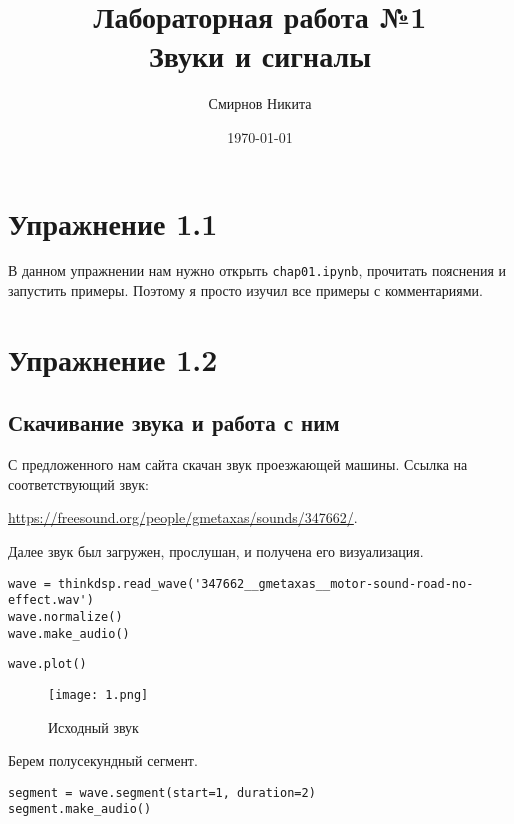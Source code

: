 \documentclass[a4paper,12pt]{report}
\title{Лабораторная работа №1\\Звуки и сигналы}
\author{Смирнов Никита}
\date{\today}
\begin{document}
\maketitle
\tableofcontents
\listoffigures
\lstlistoflistings

\maketitle

\chapter{Упражнение 1.1}

В данном упражнении нам нужно открыть \texttt{chap01.ipynb}, прочитать пояснения и  запустить примеры. Поэтому я просто изучил все примеры с комментариями. 

\chapter{Упражнение 1.2}
\section{Скачивание звука и работа с ним}

С предложенного нам сайта скачан звук проезжающей машины. Ссылка на соответствующий звук:

\href{https://freesound.org/people/gmetaxas/sounds/347662/}{https://freesound.org/people/gmetaxas/sounds/347662/}.

Далее звук был загружен, прослушан, и получена его визуализация.

\begin{lstlisting}[caption=Загрузка и прослушивание звука]
wave = thinkdsp.read_wave('347662__gmetaxas__motor-sound-road-no-effect.wav')
wave.normalize()
wave.make_audio()
\end{lstlisting}

\begin{lstlisting}[caption=Визуализация звука]
wave.plot()
\end{lstlisting}

\begin{figure}[H]
        \centering
        \texttt{[image: 1.png]}
        \caption{Исходный звук}
        \label{fig: fig2_1}
\end{figure}
    
Берем полусекундный сегмент.

\begin{lstlisting}[caption=Изменение и прослушивание звука]
segment = wave.segment(start=1, duration=2)
segment.make_audio()
\end{lstlisting}
\end{document}
